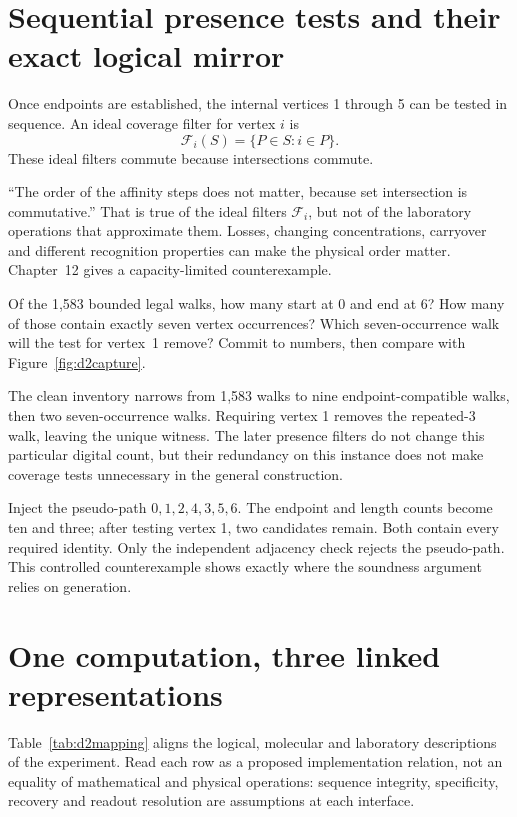 \section{Sequential presence tests and their exact logical mirror}
Once endpoints are established, the internal vertices 1 through 5 can be tested in sequence. An ideal coverage filter for vertex $i$ is
\[
\mathcal F_i(S)=\{P\in S:i\in P\}.
\]
These ideal filters commute because intersections commute.

\begin{Pitfall}
``The order of the affinity steps does not matter, because set intersection is
commutative.'' That is true of the ideal filters $\mathcal F_i$, but not of the
laboratory operations that approximate them. Losses, changing concentrations,
carryover and different recognition properties can make the physical order
matter. Chapter~12 gives a capacity-limited counterexample.
\end{Pitfall}

\begin{TryThis}
Of the 1,583 bounded legal walks, how many start at 0 and end at 6? How many of
those contain exactly seven vertex occurrences? Which seven-occurrence walk will
the test for vertex~1 remove? Commit to numbers, then compare with
Figure~\ref{fig:d2capture}.
\end{TryThis}


The clean inventory narrows from 1,583 walks to nine endpoint-compatible walks, then two seven-occurrence walks. Requiring vertex 1 removes the repeated-3 walk, leaving the unique witness. The later presence filters do not change this particular digital count, but their redundancy on this instance does not make coverage tests unnecessary in the general construction.

Inject the pseudo-path $0,1,2,4,3,5,6$. The endpoint and length counts become ten and three; after testing vertex 1, two candidates remain. Both contain every required identity. Only the independent adjacency check rejects the pseudo-path. This controlled counterexample shows exactly where the soundness argument relies on generation.

\section{One computation, three linked representations}
Table~\ref{tab:d2mapping} aligns the logical, molecular and laboratory
descriptions of the experiment. Read each row as a proposed implementation
relation, not an equality of mathematical and physical operations: sequence
integrity, specificity, recovery and readout resolution are assumptions at each
interface.

